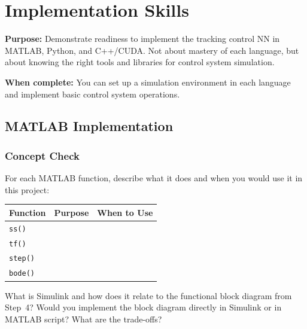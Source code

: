 \section{Implementation Skills}

\begin{purposebox}
\textbf{Purpose:} Demonstrate readiness to implement the tracking control NN in MATLAB, Python, and C++/CUDA. Not about mastery of each language, but about knowing the right tools and libraries for control system simulation.

\textbf{When complete:} You can set up a simulation environment in each language and implement basic control system operations.
\end{purposebox}

\subsection{MATLAB Implementation}

\subsubsection*{Concept Check}

For each MATLAB function, describe what it does and when you would use it in this project:

\medskip
\begin{tabularx}{\textwidth}{l X X}
\toprule
\textbf{Function} & \textbf{Purpose} & \textbf{When to Use} \\
\midrule
\texttt{ss()}   & & \\[0.8em]
\texttt{tf()}   & & \\[0.8em]
\texttt{step()} & & \\[0.8em]
\texttt{bode()} & & \\
\bottomrule
\end{tabularx}

\begin{answerbox}\end{answerbox}

What is Simulink and how does it relate to the functional block diagram from Step~4? Would you implement the block diagram directly in Simulink or in MATLAB script? What are the trade-offs?

\begin{answerbox}\end{answerbox}


